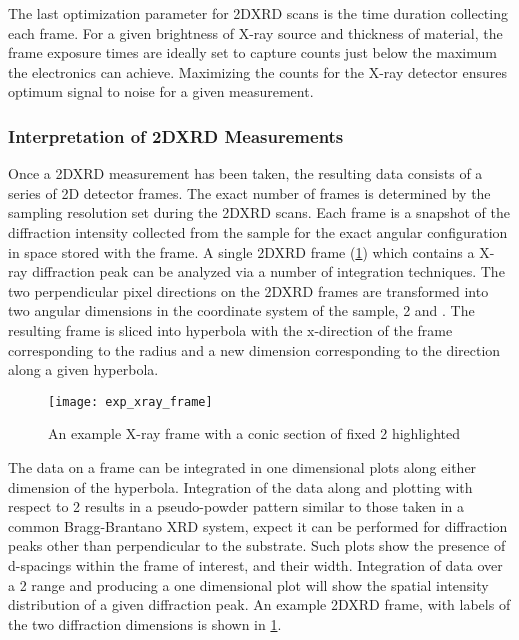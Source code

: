 The last optimization parameter for 2DXRD scans is the time duration collecting each frame.
For a given brightness of X-ray source and thickness of material, the frame exposure times are ideally set to capture counts just below the maximum the electronics can achieve.
Maximizing the counts for the X-ray detector ensures optimum signal to noise for a given measurement.

\subsubsection{Interpretation of 2DXRD Measurements} Once a 2DXRD measurement has been taken, the resulting data consists of a series of 2D detector frames.
The exact number of frames is determined by the sampling resolution set during the 2DXRD scans.
Each frame is a snapshot of the diffraction intensity collected from the sample for the exact angular configuration in space stored with the frame.
A single 2DXRD frame (\cref{fig:exp_xray_frame}) which contains a X-ray diffraction peak can be analyzed via a number of integration techniques.
The two perpendicular pixel directions on the 2DXRD frames are transformed into two angular dimensions in the coordinate system of the sample, 2\straighttheta{} and \textchi{} \cite{He2009}.
The resulting frame is sliced into hyperbola with the x-direction of the frame corresponding to the radius and a new dimension \textchi{} corresponding to the direction along a given hyperbola.
\begin{figure}
 \centering \texttt{[image: exp\_xray\_frame]}
 \caption[Example 2DXRD frame]{\label{fig:exp_xray_frame}An example X-ray frame with a conic section of fixed 2\straighttheta{} highlighted}
\end{figure}

The data on a frame can be integrated in one dimensional plots along either dimension of the hyperbola.
Integration of the data along \textchi{} and plotting with respect to 2\straighttheta{} results in a pseudo-powder pattern similar to those taken in a common Bragg-Brantano XRD system, expect it can be performed for diffraction peaks other than perpendicular to the substrate.
Such plots show the presence of d-spacings within the frame of interest, and their width.
Integration of data over a 2\straighttheta{} range and producing a one dimensional plot will show the spatial intensity distribution of a given diffraction peak.
An example 2DXRD frame, with labels of the two diffraction dimensions is shown in \cref{fig:exp_xray_frame}.

